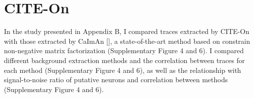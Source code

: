
\chapter{CITE-On} %

\label{CITE-On} %
In the study presented in Appendix B, I compared traces extracted by CITE-On with those extracted by CaImAn [\cite{giovannucci2019}], a state-of-the-art method  based  on constrain non-negative matrix factorization (Supplementary Figure 4 and 6).
I compared different background extraction methods and the correlation between traces for each method (Supplementary Figure 4 and 6), as well as the relationship with signal-to-noise ratio of putative neurons and correlation between methods (Supplementary Figure 4 and 6). 

